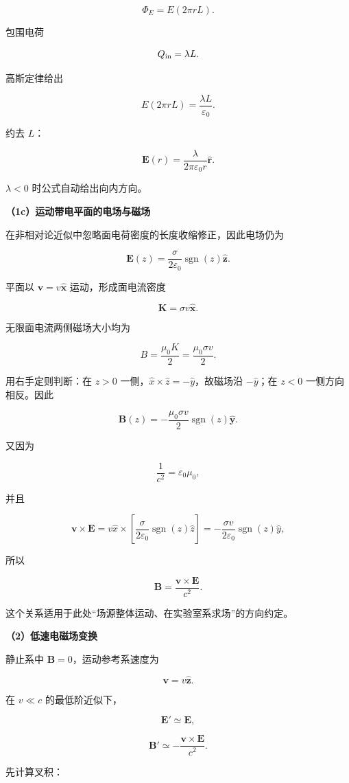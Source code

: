 \documentclass[12pt,a4paper,UTF8]{ctexart}
\begin{document}
\[\Phi_E=E(2\pi rL).\]

包围电荷

\[Q_{\rm in}=\lambda L.\]

高斯定律给出

\[E(2\pi rL)=\frac{\lambda L}{\varepsilon_0}.\]

约去 \(L\)：

\[
\boxed{
\bm E(r)=\frac{\lambda}{2\pi\varepsilon_0r}\hat{\bm r}
}.
\]

\(\lambda<0\) 时公式自动给出向内方向。

\textbf{（1c）运动带电平面的电场与磁场}

在非相对论近似中忽略面电荷密度的长度收缩修正，因此电场仍为

\[
\boxed{
\bm E(z)=\frac{\sigma}{2\varepsilon_0}\operatorname{sgn}(z)\hat{\bm z}
}.
\]

平面以 \(\bm v=v\hat{\bm x}\) 运动，形成面电流密度

\[
\bm K=\sigma v\hat{\bm x}.
\]

无限面电流两侧磁场大小均为

\[B=\frac{\mu_0K}{2}=\frac{\mu_0\sigma v}{2}.\]

用右手定则判断：在 \(z>0\)
一侧，\(\hat x\times\hat z=-\hat y\)，故磁场沿 \(-\hat y\)；在 \(z<0\)
一侧方向相反。因此

\[
\boxed{
\bm B(z)=-\frac{\mu_0\sigma v}{2}\operatorname{sgn}(z)\hat{\bm y}
}.
\]

又因为

\[
\frac1{c^2}=\varepsilon_0\mu_0,
\]

并且

\[
\bm v\times\bm E
=v\hat x\times\left[\frac{\sigma}{2\varepsilon_0}\operatorname{sgn}(z)\hat z\right]
=-\frac{\sigma v}{2\varepsilon_0}\operatorname{sgn}(z)\hat y,
\]

所以

\[
\boxed{
\bm B=\frac{\bm v\times\bm E}{c^2}
}.
\]

这个关系适用于此处``场源整体运动、在实验室系求场''的方向约定。

\textbf{（2）低速电磁场变换}

静止系中 \(\bm B=0\)，运动参考系速度为

\[\bm v=v\hat{\bm z}.\]

在 \(v\ll c\) 的最低阶近似下，

\[
\boxed{\bm E'\simeq\bm E},
\]

\[
\boxed{\bm B'\simeq-\frac{\bm v\times\bm E}{c^2}}.
\]

先计算叉积：
\end{document}
